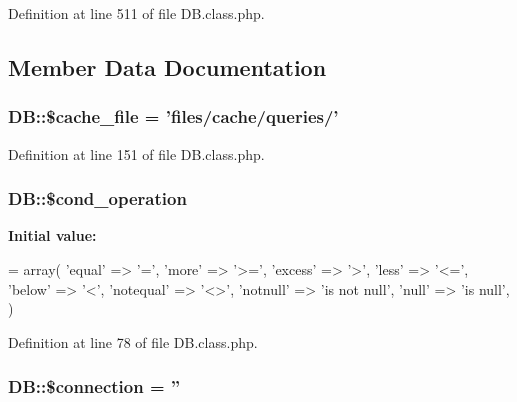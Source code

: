 Definition at line 511 of file D\+B.\+class.\+php.



\subsection{Member Data Documentation}
\hypertarget{classDB_a9952a27cbf07942e5bb8853ab95b5bdb}{
\subsubsection[{\$cache\+\_\+file}]{\setlength{\rightskip}{0pt plus 5cm}D\+B\+::\$cache\+\_\+file = 'files/cache/queries/'}}\label{classDB_a9952a27cbf07942e5bb8853ab95b5bdb}


Definition at line 151 of file D\+B.\+class.\+php.

\hypertarget{classDB_a85f8f65c37474b0e65d844e1f01f39b0}{
\subsubsection[{\$cond\+\_\+operation}]{\setlength{\rightskip}{0pt plus 5cm}D\+B\+::\$cond\+\_\+operation}}\label{classDB_a85f8f65c37474b0e65d844e1f01f39b0}
{\bfseries Initial value\+:}
\begin{DoxyCode}
= array(
        \textcolor{stringliteral}{'equal'} => \textcolor{charliteral}{'='},
        \textcolor{stringliteral}{'more'} => \textcolor{stringliteral}{'>='},
        \textcolor{stringliteral}{'excess'} => \textcolor{charliteral}{'>'},
        \textcolor{stringliteral}{'less'} => \textcolor{stringliteral}{'<='},
        \textcolor{stringliteral}{'below'} => \textcolor{charliteral}{'<'},
        \textcolor{stringliteral}{'notequal'} => \textcolor{stringliteral}{'<>'},
        \textcolor{stringliteral}{'notnull'} => \textcolor{stringliteral}{'is not null'},
        \textcolor{stringliteral}{'null'} => \textcolor{stringliteral}{'is null'},
    )
\end{DoxyCode}


Definition at line 78 of file D\+B.\+class.\+php.

\hypertarget{classDB_ac9071e31f8241ad644430537f39a16ce}{
\subsubsection[{\$connection}]{\setlength{\rightskip}{0pt plus 5cm}D\+B\+::\$connection = ''}}\label{classDB_ac9071e31f8241ad644430537f39a16ce}


